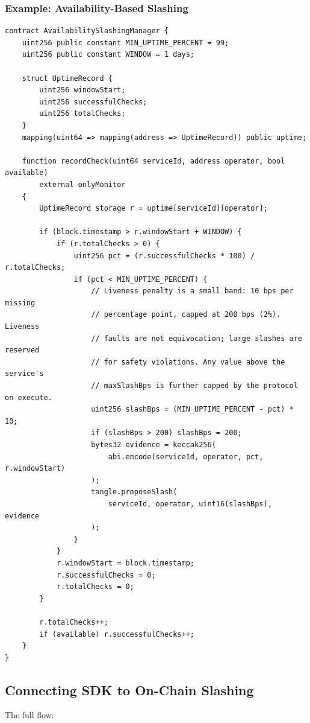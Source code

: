 \documentclass[11pt,a4paper]{article}
\begin{document}
\subsubsection{Example: Availability-Based Slashing}

\begin{lstlisting}[style=solidity]
contract AvailabilitySlashingManager {
    uint256 public constant MIN_UPTIME_PERCENT = 99;
    uint256 public constant WINDOW = 1 days;

    struct UptimeRecord {
        uint256 windowStart;
        uint256 successfulChecks;
        uint256 totalChecks;
    }
    mapping(uint64 => mapping(address => UptimeRecord)) public uptime;

    function recordCheck(uint64 serviceId, address operator, bool available)
        external onlyMonitor
    {
        UptimeRecord storage r = uptime[serviceId][operator];

        if (block.timestamp > r.windowStart + WINDOW) {
            if (r.totalChecks > 0) {
                uint256 pct = (r.successfulChecks * 100) / r.totalChecks;
                if (pct < MIN_UPTIME_PERCENT) {
                    // Liveness penalty is a small band: 10 bps per missing
                    // percentage point, capped at 200 bps (2%). Liveness
                    // faults are not equivocation; large slashes are reserved
                    // for safety violations. Any value above the service's
                    // maxSlashBps is further capped by the protocol on execute.
                    uint256 slashBps = (MIN_UPTIME_PERCENT - pct) * 10;
                    if (slashBps > 200) slashBps = 200;
                    bytes32 evidence = keccak256(
                        abi.encode(serviceId, operator, pct, r.windowStart)
                    );
                    tangle.proposeSlash(
                        serviceId, operator, uint16(slashBps), evidence
                    );
                }
            }
            r.windowStart = block.timestamp;
            r.successfulChecks = 0;
            r.totalChecks = 0;
        }

        r.totalChecks++;
        if (available) r.successfulChecks++;
    }
}
\end{lstlisting}

\subsection{Connecting SDK to On-Chain Slashing}

The full flow:
\end{document}

